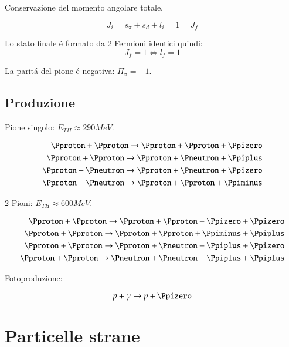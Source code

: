 \documentclass[main.tex]{subfiles}
\begin{document}
Conservazione del momento angolare totale.

\begin{equation*}
J_i=s_{\pi}+s_d+l_i=1=J_f
\end{equation*}

Lo stato finale \'e formato da 2 Fermioni identici quindi: 
\begin{equation*}
J_f=1\Leftrightarrow l_f=1
\end{equation*}

La parit\'a del pione \'e negativa: $\Pi_{\pi}=-1$.


\section{Produzione}

\begin{itemize*}
\item Pione singolo: $E_{TH}\approx 290MeV$.
 
 \begin{align*}
 \Pproton+\Pproton\rightarrow \Pproton+\Pproton+\Ppizero\\
 \Pproton+\Pproton\rightarrow \Pproton+\Pneutron+\Ppiplus\\
 \Pproton+\Pneutron\rightarrow \Pproton+\Pneutron+\Ppizero\\
 \Pproton+\Pneutron\rightarrow \Pproton+\Pproton+\Ppiminus
 \end{align*}
 
 
 \item 2 Pioni: $E_{TH}\approx 600MeV$.
 
 \begin{align*}
 \Pproton+\Pproton\rightarrow \Pproton+\Pproton+\Ppizero+\Ppizero\\
 \Pproton+\Pproton\rightarrow \Pproton+\Pproton+\Ppiminus+\Ppiplus\\
 \Pproton+\Pproton\rightarrow \Pproton+\Pneutron+\Ppiplus+\Ppizero\\
 \Pproton+\Pproton\rightarrow \Pneutron+\Pneutron+\Ppiplus+\Ppiplus
 \end{align*}
 
 \item Fotoproduzione:
 
 \begin{equation*}
p+\gamma\rightarrow p+\Ppizero
 \end{equation*}

\end{itemize*}


\chapter{Particelle strane}
\end{document}
